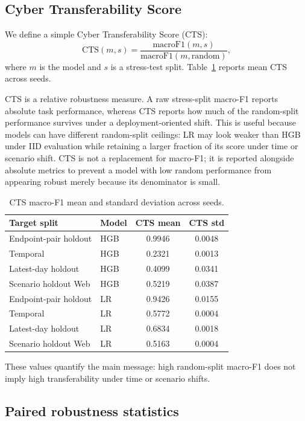 \documentclass[11pt,a4paper]{article}
\begin{document}
\subsection{Cyber Transferability Score}

We define a simple Cyber Transferability Score (CTS):
\[
\mathrm{CTS}(m,s)=\frac{\mathrm{macroF1}(m,s)}{\mathrm{macroF1}(m,\mathrm{random})},
\]
where \(m\) is the model and \(s\) is a stress-test split. Table~\ref{tab:cts} reports mean CTS across seeds.

CTS is a relative robustness measure. A raw stress-split macro-F1 reports absolute task performance, whereas CTS reports how much of the random-split performance survives under a deployment-oriented shift. This is useful because models can have different random-split ceilings: LR may look weaker than HGB under IID evaluation while retaining a larger fraction of its score under time or scenario shift. CTS is not a replacement for macro-F1; it is reported alongside absolute metrics to prevent a model with low random performance from appearing robust merely because its denominator is small.

\begin{table}[ht]
\centering
\caption{CTS macro-F1 mean and standard deviation across seeds.}
\label{tab:cts}
\begin{tabular}{llcc}
\toprule
Target split & Model & CTS mean & CTS std \\
\midrule
Endpoint-pair holdout & HGB & 0.9946 & 0.0048 \\
Temporal & HGB & 0.2321 & 0.0013 \\
Latest-day holdout & HGB & 0.4099 & 0.0341 \\
Scenario holdout Web & HGB & 0.5219 & 0.0387 \\
Endpoint-pair holdout & LR & 0.9426 & 0.0155 \\
Temporal & LR & 0.5772 & 0.0004 \\
Latest-day holdout & LR & 0.6834 & 0.0018 \\
Scenario holdout Web & LR & 0.5163 & 0.0004 \\
\bottomrule
\end{tabular}
\end{table}

These values quantify the main message: high random-split macro-F1 does not imply high transferability under time or scenario shifts.

\subsection{Paired robustness statistics}
\end{document}
